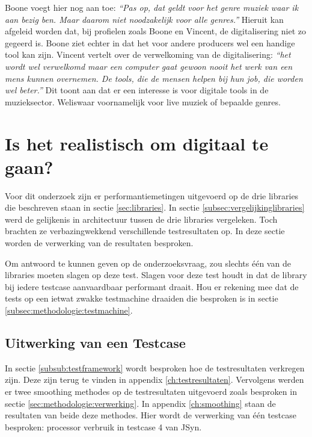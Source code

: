 Boone voegt hier nog aan toe: \textit{``Pas op, dat geldt voor het genre muziek waar ik aan bezig ben. Maar daarom niet noodzakelijk voor alle genres.''} \autocite{peterboone} Hieruit kan afgeleid worden dat, bij profielen zoals Boone en Vincent, de digitalisering niet zo gegeerd is. Boone ziet echter in dat het voor andere producers wel een handige tool kan zijn. Vincent vertelt over de verwelkoming van de digitalisering: \textit{``het wordt wel verwelkomd maar een computer gaat gewoon nooit het werk van een mens kunnen overnemen. De tools, die de mensen helpen bij hun job, die worden wel beter.''} \autocite{bartvincent} Dit toont aan dat er een interesse is voor digitale tools in de muzieksector. Weliswaar voornamelijk voor live muziek of bepaalde genres.

\section{Is het realistisch om digitaal te gaan?}
\label{onderzoeksvraag3}

Voor dit onderzoek zijn er performantiemetingen uitgevoerd op de drie libraries die beschreven staan in sectie \ref{sec:libraries}. In sectie \ref{subsec:vergelijkinglibraries} werd de gelijkenis in architectuur tussen de drie libraries vergeleken. Toch brachten ze verbazingwekkend verschillende testresultaten op. In deze sectie worden de verwerking van de resultaten besproken. 

Om antwoord te kunnen geven op de onderzoeksvraag, zou slechts één van de libraries moeten slagen op deze test. Slagen voor deze test houdt in dat de library bij iedere testcase aanvaardbaar performant draait. Hou er rekening mee dat de tests op een ietwat zwakke testmachine draaiden die besproken is in sectie \ref{subsec:methodologie:testmachine}.

\subsection{Uitwerking van een Testcase}
\label{calctestcase}

In sectie \ref{subsub:testframework} wordt besproken hoe de testresultaten verkregen zijn. Deze zijn terug te vinden in appendix \ref{ch:testresultaten}. Vervolgens werden er twee smoothing methodes op de testresultaten uitgevoerd zoals besproken in sectie \ref{sec:methodologie:verwerking}. In appendix \ref{ch:smoothing} staan de resultaten van beide deze methodes. Hier wordt de verwerking van één testcase besproken: processor verbruik in testcase 4 van JSyn.

